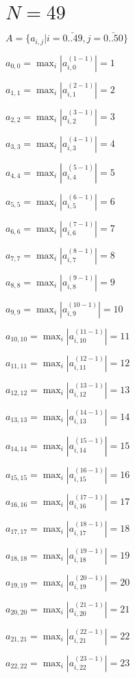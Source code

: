 \documentclass[a4paper,12pt]{article}
\begin{document}
\section{ $N = 49$ }
$A = \{ a _{ i, j } | i = \bar { 0..49 }, j = \bar { 0..50 } \}$

$a _{ 0, 0 } =  \max _i |a _{ i, 0 } ^{ (1 - 1) } | = 1$

$a _{ 1, 1 } =  \max _i |a _{ i, 1 } ^{ (2 - 1) } | = 2$

$a _{ 2, 2 } =  \max _i |a _{ i, 2 } ^{ (3 - 1) } | = 3$

$a _{ 3, 3 } =  \max _i |a _{ i, 3 } ^{ (4 - 1) } | = 4$

$a _{ 4, 4 } =  \max _i |a _{ i, 4 } ^{ (5 - 1) } | = 5$

$a _{ 5, 5 } =  \max _i |a _{ i, 5 } ^{ (6 - 1) } | = 6$

$a _{ 6, 6 } =  \max _i |a _{ i, 6 } ^{ (7 - 1) } | = 7$

$a _{ 7, 7 } =  \max _i |a _{ i, 7 } ^{ (8 - 1) } | = 8$

$a _{ 8, 8 } =  \max _i |a _{ i, 8 } ^{ (9 - 1) } | = 9$

$a _{ 9, 9 } =  \max _i |a _{ i, 9 } ^{ (10 - 1) } | = 10$

$a _{ 10, 10 } =  \max _i |a _{ i, 10 } ^{ (11 - 1) } | = 11$

$a _{ 11, 11 } =  \max _i |a _{ i, 11 } ^{ (12 - 1) } | = 12$

$a _{ 12, 12 } =  \max _i |a _{ i, 12 } ^{ (13 - 1) } | = 13$

$a _{ 13, 13 } =  \max _i |a _{ i, 13 } ^{ (14 - 1) } | = 14$

$a _{ 14, 14 } =  \max _i |a _{ i, 14 } ^{ (15 - 1) } | = 15$

$a _{ 15, 15 } =  \max _i |a _{ i, 15 } ^{ (16 - 1) } | = 16$

$a _{ 16, 16 } =  \max _i |a _{ i, 16 } ^{ (17 - 1) } | = 17$

$a _{ 17, 17 } =  \max _i |a _{ i, 17 } ^{ (18 - 1) } | = 18$

$a _{ 18, 18 } =  \max _i |a _{ i, 18 } ^{ (19 - 1) } | = 19$

$a _{ 19, 19 } =  \max _i |a _{ i, 19 } ^{ (20 - 1) } | = 20$

$a _{ 20, 20 } =  \max _i |a _{ i, 20 } ^{ (21 - 1) } | = 21$

$a _{ 21, 21 } =  \max _i |a _{ i, 21 } ^{ (22 - 1) } | = 22$

$a _{ 22, 22 } =  \max _i |a _{ i, 22 } ^{ (23 - 1) } | = 23$
\end{document}
